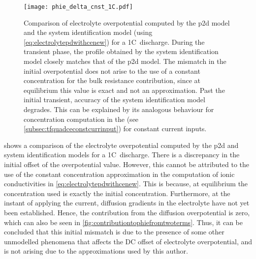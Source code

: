 \begin{figure}[!htbp]
    \centering
    \texttt{[image: phie\_delta\_cnst\_1C.pdf]}
    \caption[%
    Electrolyte  overpotential  computed  by the    and  system
    identification models for a 1C~discharge
    ]%
    {%
        Comparison    of    electrolyte    overpotential   computed    by    the
        \gls{p2d}     model    and     the    system     identification    model
        (using \cref{eq:electrolytepdwithcenew}) for a  1C~discharge. During the
        transient phase, the profile obtained by the system identification model
        closely matches that of the \gls{p2d} model. The mismatch in the initial
        overpotential does not arise to the  use of a constant concentration for
        the bulk  resistance contribution,  since at  equilibrium this  value is
        exact and  not an  approximation. Past  the initial  transient, accuracy
        of  the system  identification  model degrades.  This  can be  explained
        by  its  analogous  behaviour   for  concentration  computation  in  the
         (see \cref{subsec:tfquadceconstcurrinput}) for constant
        current inputs.
    }%
    \label{fig:phiedeltacnst1C}
\end{figure}

 shows  a comparison of the  electrolyte overpotential
computed  by   the  \gls{p2d}  and   system  identification  models  for   a  1C~discharge. There  is a discrepancy  in the  initial offset of  the overpotential
value.  However,  this  cannot  be  attributed   to  the  use  of  the  constant
concentration  approximation   in  the   computation  of   ionic  conductivities
in \cref{eq:electrolytepdwithcenew}.  This   is  because,  at   equilibrium  the
concentration used  is exactly  the initial  concentration. Furthermore,  at the
instant of applying the current, diffusion gradients in the electrolyte have not
yet been established.  Hence, the contribution from  the diffusion overpotential
is zero,  which can  also be  seen in \cref{fig:contributiontophiefromtwoterms}.
Thus, it can be  concluded that this initial mismatch is due  to the presence of
some  other unmodelled  phenomena  that  affects the  DC  offset of  electrolyte
overpotential, and is not arising due to the approximations used by this author.

